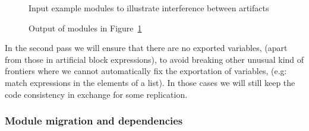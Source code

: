 \begin{figure}
\begin{minipage}[t]{0.5\columnwidth}%
%
\end{minipage}%
\begin{minipage}[t]{0.5\columnwidth}%
%
\end{minipage}

\caption{Input example modules to illustrate interference between artifacts\label{fig:interference-input}}
\end{figure}


\begin{figure}
\begin{minipage}[t]{1\columnwidth}%
%
\end{minipage}

\begin{minipage}[t]{1\columnwidth}%
%
\end{minipage}

\begin{minipage}[t]{1\columnwidth}%
%
\end{minipage}

\caption{Output of modules in Figure~\ref{fig:interference-input}\label{fig:interference-output}}
\end{figure}


In the second pass we will ensure that there are no exported variables,
(apart from those in artificial block expressions), to avoid breaking
other unusual kind of frontiers where we cannot automatically fix
the exportation of variables, (e.g: match expressions in the elements
of a list). In those cases we will still keep the code consistency
in exchange for some replication.


\subsubsection{Module migration and dependencies}

